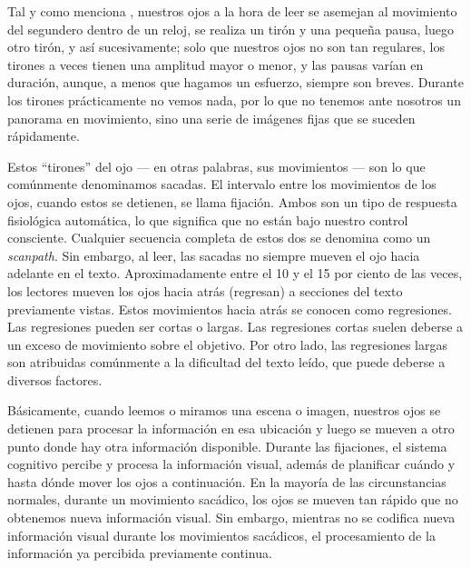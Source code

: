 Tal y como menciona \textcite{Brown1895}, nuestros ojos a la hora de leer se asemejan al movimiento del segundero dentro de un reloj, se realiza un tirón y una pequeña pausa, luego otro tirón, y así sucesivamente; solo que nuestros ojos no son tan regulares, los tirones a veces tienen una amplitud mayor o menor, y las pausas varían en duración, aunque, a menos que hagamos un esfuerzo, siempre son breves. Durante los tirones prácticamente no vemos nada, por lo que no tenemos ante nosotros un panorama en movimiento, sino una serie de imágenes fijas que se suceden rápidamente.

Estos “tirones” del ojo — en otras palabras, sus movimientos — son lo que comúnmente denominamos sacadas. El intervalo entre los movimientos de los ojos, cuando estos se detienen, se llama fijación. Ambos son un tipo de respuesta fisiológica automática, lo que significa que no están bajo nuestro control consciente. \parencite{Rayner2012} Cualquier secuencia completa de estos dos se denomina como un \textit{scanpath}. Sin embargo, al leer, las sacadas no siempre mueven el ojo hacia adelante en el texto. Aproximadamente entre el 10 y el 15 por ciento de las veces, los lectores mueven los ojos hacia atrás (regresan) a secciones del texto previamente vistas. Estos movimientos hacia atrás se conocen como regresiones. Las regresiones pueden ser cortas o largas. Las regresiones cortas suelen deberse a un exceso de movimiento sobre el objetivo. Por otro lado, las regresiones largas son atribuidas comúnmente a la dificultad del texto leído, que puede deberse a diversos factores.

Básicamente, cuando leemos o miramos una escena o imagen, nuestros ojos se detienen para procesar la información en esa ubicación y luego se mueven a otro punto donde hay otra información disponible. Durante las fijaciones, el sistema cognitivo percibe y procesa la información visual, además de planificar cuándo y hasta dónde mover los ojos a continuación. En la mayoría de las circunstancias normales, durante un movimiento sacádico, los ojos se mueven tan rápido que no obtenemos nueva información visual. \parencite{Rayner2009} Sin embargo, mientras no se codifica nueva información visual durante los movimientos sacádicos, el procesamiento de la información ya percibida previamente continua. \parencite{Irwin1998} \parencite{Irwin1996}

